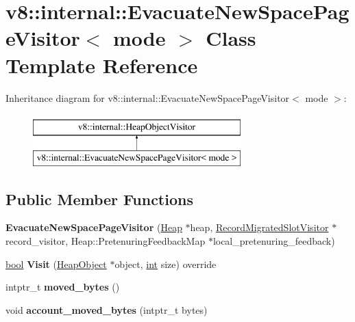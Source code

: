 \hypertarget{classv8_1_1internal_1_1EvacuateNewSpacePageVisitor}{}\section{v8\+:\+:internal\+:\+:Evacuate\+New\+Space\+Page\+Visitor$<$ mode $>$ Class Template Reference}
\label{classv8_1_1internal_1_1EvacuateNewSpacePageVisitor}
Inheritance diagram for v8\+:\+:internal\+:\+:Evacuate\+New\+Space\+Page\+Visitor$<$ mode $>$\+:\begin{figure}[H]
\begin{center}
\leavevmode
\includegraphics[height=2.000000cm]{classv8_1_1internal_1_1EvacuateNewSpacePageVisitor}
\end{center}
\end{figure}
\subsection*{Public Member Functions}
\begin{DoxyCompactItemize}
\item 
\mbox{\label{classv8_1_1internal_1_1EvacuateNewSpacePageVisitor_a6d31dca4912da2ce704bc1cc8ce29405}} 
{\bfseries Evacuate\+New\+Space\+Page\+Visitor} (\mbox{\hyperlink{classv8_1_1internal_1_1Heap}{Heap}} $\ast$heap, \mbox{\hyperlink{classv8_1_1internal_1_1RecordMigratedSlotVisitor}{Record\+Migrated\+Slot\+Visitor}} $\ast$record\+\_\+visitor, Heap\+::\+Pretenuring\+Feedback\+Map $\ast$local\+\_\+pretenuring\+\_\+feedback)
\item 
\mbox{\label{classv8_1_1internal_1_1EvacuateNewSpacePageVisitor_aa62ac064f879d1fe24de9c37a85c1e69}} 
\mbox{\hyperlink{classbool}{bool}} {\bfseries Visit} (\mbox{\hyperlink{classv8_1_1internal_1_1HeapObject}{Heap\+Object}} $\ast$object, \mbox{\hyperlink{classint}{int}} size) override
\item 
\mbox{\label{classv8_1_1internal_1_1EvacuateNewSpacePageVisitor_ab654602cde05ace490f3ef1d6e80547a}} 
intptr\+\_\+t {\bfseries moved\+\_\+bytes} ()
\item 
\mbox{\label{classv8_1_1internal_1_1EvacuateNewSpacePageVisitor_ade433d80a06e40f5fd06287c1b60e836}} 
void {\bfseries account\+\_\+moved\+\_\+bytes} (intptr\+\_\+t bytes)
\end{DoxyCompactItemize}
